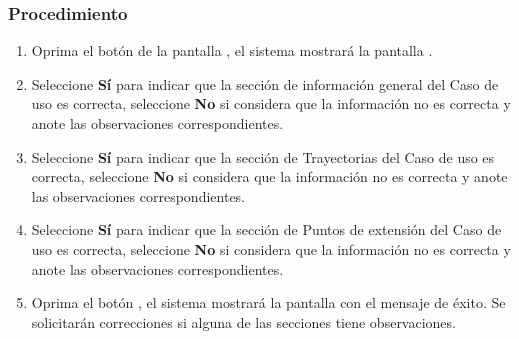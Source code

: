 \subsubsection{Procedimiento}
\begin{enumerate}
	\item Oprima el botón \btnSolicitarCorrecciones de la pantalla , el sistema mostrará la pantalla . 

	 
	\item Seleccione \textbf{Sí} para indicar que la sección de información general del Caso de uso es correcta, seleccione \textbf{No} si considera que la información no es correcta y anote las observaciones correspondientes.
	
	\item Seleccione \textbf{Sí} para indicar que la sección de Trayectorias del Caso de uso es correcta, seleccione \textbf{No} si considera que la información no es correcta y anote las observaciones correspondientes.
	
	\item Seleccione \textbf{Sí} para indicar que la sección de Puntos de extensión del Caso de uso es correcta, seleccione \textbf{No} si considera que la información no es correcta y anote las observaciones correspondientes.
	
	\item Oprima el botón , el sistema mostrará la pantalla  con el mensaje de éxito. Se solicitarán correcciones si alguna de las secciones tiene observaciones.
\end{enumerate}

